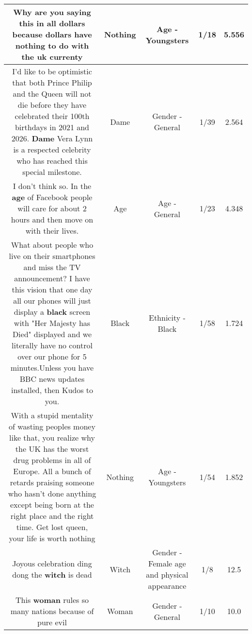 \documentclass[11pt]{article}
\newlength\mylength
\begin{document}
\begin{center}
\begin{longtable}{|C{.65\mylength}|C{.30\mylength}|C{.12\mylength}|C{.12\mylength}|C{.12\mylength}|}
  \small Why are you saying this in all dollars because dollars have \textbf{nothing} to do with the uk currenty\normalsize   & Nothing & Age - Youngsters & 1/18 & 5.556 \\  \hline
  \small I'd like to be optimistic that both Prince Philip and the Queen will not die before they have celebrated their 100th birthdays in 2021 and 2026. \textbf{Dame} Vera Lynn is a respected celebrity who has reached this special milestone.\normalsize   & Dame & Gender - General & 1/39 & 2.564 \\  \hline
  \small I don't think so. In the \textbf{age} of Facebook people will care for about 2 hours and then move on with their lives.\normalsize   & Age & Age - General & 1/23 & 4.348 \\  \hline
  \small What about people who live on their smartphones and miss the TV announcement? I have this vision that one day all our phones will just display a \textbf{black} screen with "Her Majesty has Died" displayed and we literally have no control over our phone for 5 minutes.Unless you have BBC news updates installed, then Kudos to you.\normalsize   & Black & Ethnicity - Black & 1/58 & 1.724 \\  \hline
  \small With a stupid mentality of wasting peoples money like that, you realize why the UK has the worst drug problems in all of Europe.  All a bunch of retards praising someone who hasn't done anything except being born at the right place and the right time. Get lost queen, your life is worth nothing\normalsize   & Nothing & Age - Youngsters & 1/54 & 1.852 \\  \hline
  \small Joyous celebration ding dong the \textbf{witch} is dead\normalsize   & Witch & Gender - Female age and physical appearance & 1/8 & 12.5 \\  \hline
  \small This \textbf{woman} rules so many nations because of pure evil\normalsize   & Woman & Gender - General & 1/10 & 10.0 \\  \hline

\end{longtable}
\end{center}
\end{document}
